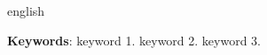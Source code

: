 \begin{resumo}[English]
 \begin{otherlanguage*}{english}


 \vspace{\onelineskip}

 \noindent
 \textbf{Keywords}: keyword 1. keyword 2. keyword 3.
 \end{otherlanguage*}
\end{resumo}
